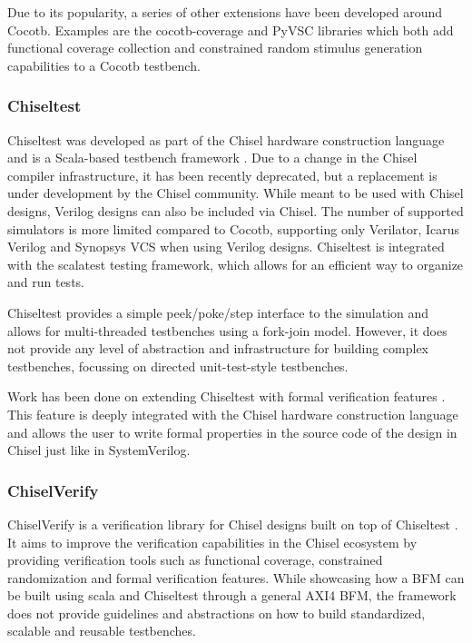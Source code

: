 Due to its popularity, a series of other extensions have been developed around Cocotb. Examples are the
cocotb-coverage \cite{crvpython} and PyVSC \cite{pyvsc} libraries which both add functional coverage collection and
constrained random stimulus generation capabilities to a Cocotb testbench.

\subsubsection{Chiseltest} %

Chiseltest was developed as part of the Chisel hardware construction language \cite{chiselpaper} and is a Scala-based testbench
framework \cite{chiseltest}. Due to a change in the Chisel compiler infrastructure, it has been recently deprecated,
but a replacement is under development by the Chisel community. While meant to be used with Chisel designs, Verilog
designs can also be included via Chisel. The number of supported simulators is more limited compared to Cocotb,
supporting only Verilator, Icarus Verilog and Synopsys VCS when using Verilog designs. Chiseltest is integrated with
the scalatest testing framework, which allows for an efficient way to organize and run tests.

Chiseltest provides a simple peek/poke/step interface to the simulation and allows for multi-threaded testbenches
using a fork-join model. However, it does not provide any
level of abstraction and infrastructure for building complex
testbenches, focussing on directed unit-test-style testbenches.

Work has been done on extending Chiseltest with formal verification features \cite{laeufer2021open}. This feature is
deeply integrated with the Chisel hardware construction language and allows the user to write formal properties in
the source code of the design in Chisel just like in SystemVerilog.



\subsubsection{ChiselVerify} %

ChiselVerify is a verification library for Chisel designs built on top of Chiseltest \cite{chiselverify}. It aims to
improve the verification capabilities in the Chisel ecosystem by providing verification tools such as functional
coverage, constrained randomization and formal verification features. While showcasing how a BFM can be built using
scala and Chiseltest through a general AXI4 BFM, the framework does not provide guidelines and abstractions on how to
build standardized, scalable and reusable testbenches.

